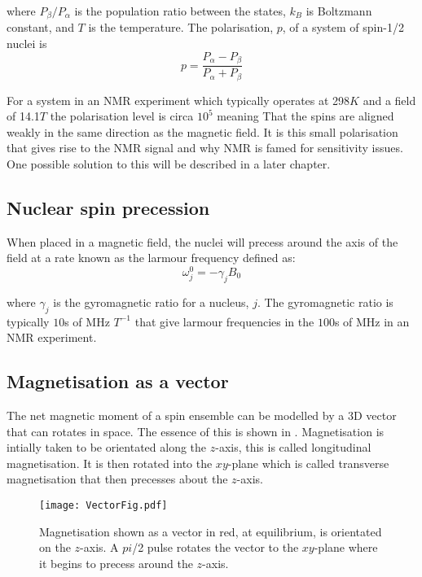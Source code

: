 where $P_{\beta}/P_{\alpha}$ is the population ratio between the states, $k_B$ is Boltzmann constant, and $T$ is the temperature. The polarisation, $p$, of a system of
spin-1/2 nuclei is
\begin{equation}
  p = \frac{P_\alpha - P_\beta}{P_\alpha + P_\beta}
\end{equation}

For a system in an NMR experiment which typically operates at 298$K$ and
a field of 14.1$T$ the polarisation level is circa $10^5$ meaning That the spins are aligned weakly in the same direction as the magnetic field. It is this small polarisation that gives rise to the NMR signal and why NMR is famed for sensitivity
issues. One possible solution to this will be described in a later chapter.

\subsection{Nuclear spin precession}

When placed in a magnetic field, the nuclei will precess around the axis of the field at a rate known as the larmour frequency defined as:
\begin{equation}\label{eqn:larmour}
  \omega_j^0 = -\gamma_jB_0
\end{equation}

where $\gamma_j$ is the gyromagnetic ratio for a nucleus, $j$. The gyromagnetic ratio is typically $10$s of MHz $T^{-1}$ that give larmour frequencies in the $100$s of MHz in an NMR experiment.

\subsection{Magnetisation as a vector}

The net magnetic moment of a spin ensemble can be modelled by a 3D vector that can rotates in space. The essence of this is shown in . Magnetisation is intially taken to be orientated along the $z$-axis, this is called longitudinal magnetisation. It is then rotated into the $xy$-plane which is called transverse
magnetisation that then precesses about the $z$-axis.

\begin{figure}
  \begin{center}
  \texttt{[image: VectorFig.pdf]}
  \end{center}
  \caption{Magnetisation shown as a vector in red, at equilibrium, is orientated on the $z$-axis. A $pi$/2
  pulse rotates the vector to the $xy$-plane where it begins to precess around the $z$-axis.}
  \label{fig:VectorFig}
\end{figure}


